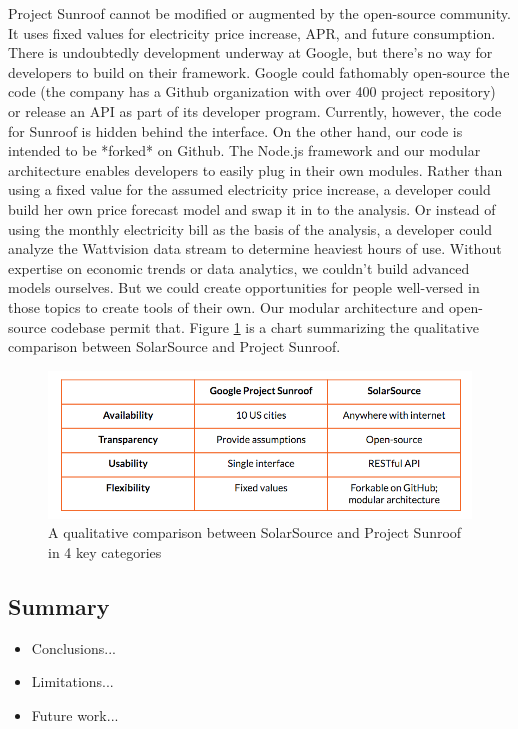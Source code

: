 \documentclass[pageno]{jpaper}
\begin{document}
Project Sunroof cannot be modified or augmented by the open-source community. It uses fixed values for electricity price increase, APR, and future consumption. There is undoubtedly development underway at Google, but there's no way for developers to build on their framework. Google could fathomably open-source the code (the company has a Github organization with over 400 project repository) or release an API as part of its developer program. Currently, however, the code for Sunroof is hidden behind the interface. On the other hand, our code is intended to be *forked* on Github. The Node.js framework and our modular architecture enables developers to easily plug in their own modules. Rather than using a fixed value for the assumed electricity price increase, a developer could build her own price forecast model and swap it in to the analysis. Or instead of using the monthly electricity bill as the basis of the analysis, a developer could analyze the Wattvision data stream to determine heaviest hours of use. Without expertise on economic trends or data analytics, we couldn't build advanced models ourselves. But we could create opportunities for people well-versed in those topics to create tools of their own. Our modular architecture and open-source codebase permit that. Figure \ref{fig:qual} is a chart summarizing the qualitative comparison between SolarSource and Project Sunroof.

\begin{figure}[h]
\begin{center}
\includegraphics {qual-analysis}
\caption{A qualitative comparison between SolarSource and Project Sunroof in 4 key categories}
\label{fig:qual}
\end{center}
\end{figure}


\subsection{Summary}
\begin{itemize}
\item Conclusions...
\item Limitations...
\item Future work...
\end{itemize}
\end{document}
